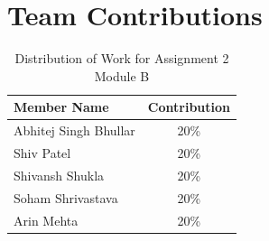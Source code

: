 \documentclass[12pt,a4paper]{article}
\begin{document}
\section{Team Contributions}
\begin{table}[H]
\centering
\caption{Distribution of Work for Assignment 2 Module B}
\begin{tabular}{lc}
\toprule
\textbf{Member Name} & \textbf{Contribution} \\
\midrule
Abhitej Singh Bhullar & 20\% \\
Shiv Patel & 20\% \\
Shivansh Shukla & 20\% \\
Soham Shrivastava & 20\% \\
Arin Mehta & 20\% \\
\bottomrule
\end{tabular}
\end{table}
\end{document}
